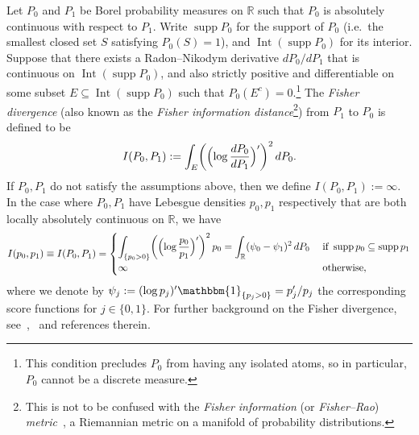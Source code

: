 \documentclass[a4paper]{article}
\newcommand{\R}{\mathbb{R}}
\newcommand{\Ind}{\mathbbm{1}}
\DeclareMathOperator{\supp}{supp}
\DeclareMathOperator{\Int}{Int}
\theoremstyle{definition}
\begin{document}
Let $P_0$ and $P_1$ be Borel probability measures on $\mathbb{R}$ such that $P_0$ is absolutely continuous with respect to $P_1$.  Write $\supp P_0$ for the support of $P_0$ (i.e.~the smallest closed set $S$ satisfying $P_0(S) = 1$), and $\Int(\supp P_0)$ for its interior. Suppose that there exists a Radon--Nikodym derivative $dP_0/dP_1$ that is continuous on $\Int(\supp P_0)$, and also strictly positive and differentiable on some subset $E \subseteq \Int(\supp P_0)$ such that $P_0(E^c) = 0$.\footnote{This condition precludes $P_0$ from having any isolated atoms, so in particular, $P_0$ cannot be a discrete measure.} The \textit{Fisher divergence} (also known as the \textit{Fisher information distance}\footnote{This is not to be confused with the \textit{Fisher information} (or \textit{Fisher--Rao}) \textit{metric}~\citep[Chapter~2]{amari2000methods}, a Riemannian metric on a manifold of probability distributions.}) from $P_1$ to $P_0$ is defined to be
\begin{equation}
\label{eq:fisher-div}
I(P_0,P_1) := \int_E \biggl(\Bigl(\log\frac{dP_0}{dP_1}\Bigr)'\biggr)^2\,dP_0.
\end{equation}
If $P_0,P_1$ do not satisfy the assumptions above, then we define $I(P_0,P_1) := \infty$. In the case where $P_0,P_1$ have Lebesgue densities $p_0,p_1$ respectively that are both locally absolutely continuous on $\R$, we have
\[
I(p_0,p_1) \equiv I(P_0,P_1) = 
\begin{cases}
\displaystyle \int_{\{p_0 > 0\}} \biggl(\Bigl(\log\frac{p_0}{p_1}\Bigr)'\biggr)^2\,p_0 = \int_\R (\psi_0 - \psi_1)^2\,dP_0
\;&\text{if }\supp p_0 \subseteq \supp p_1 \\
\infty \;&\text{otherwise},
\end{cases}
\]
where we denote by $\psi_j := (\log p_j)' \Ind_{\{p_j > 0\}} = p_j'/p_j$ the corresponding score functions for $j \in \{0,1\}$. For further background on the Fisher divergence, see~\citet[Definition~1.13]{johnson2004information},~\citet[Section~2]{yang2019variational} and references therein. 
\end{document}
